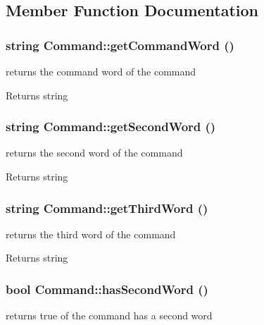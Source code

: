 \subsection{Member Function Documentation}
\hypertarget{classCommand_a03a9986a1e2adc85ef1aaf02a3387216}{
\subsubsection[{getCommandWord}]{\setlength{\rightskip}{0pt plus 5cm}string Command::getCommandWord ()}}
\label{d9/d71/classCommand_a03a9986a1e2adc85ef1aaf02a3387216}
returns the command word of the command

\begin{DoxyReturn}{Returns}
string 
\end{DoxyReturn}
\hypertarget{classCommand_a977ac7e151122d5174d74f8663725ea0}{
\subsubsection[{getSecondWord}]{\setlength{\rightskip}{0pt plus 5cm}string Command::getSecondWord ()}}
\label{d9/d71/classCommand_a977ac7e151122d5174d74f8663725ea0}
returns the second word of the command

\begin{DoxyReturn}{Returns}
string 
\end{DoxyReturn}
\hypertarget{classCommand_adb921b62cb34feb6dd522e7b9c4f23dd}{
\subsubsection[{getThirdWord}]{\setlength{\rightskip}{0pt plus 5cm}string Command::getThirdWord ()}}
\label{d9/d71/classCommand_adb921b62cb34feb6dd522e7b9c4f23dd}
returns the third word of the command

\begin{DoxyReturn}{Returns}
string 
\end{DoxyReturn}
\hypertarget{classCommand_a6a71c6f60df54f00671fd993a267d6fc}{
\subsubsection[{hasSecondWord}]{\setlength{\rightskip}{0pt plus 5cm}bool Command::hasSecondWord ()}}
\label{d9/d71/classCommand_a6a71c6f60df54f00671fd993a267d6fc}
returns true of the command has a second word

